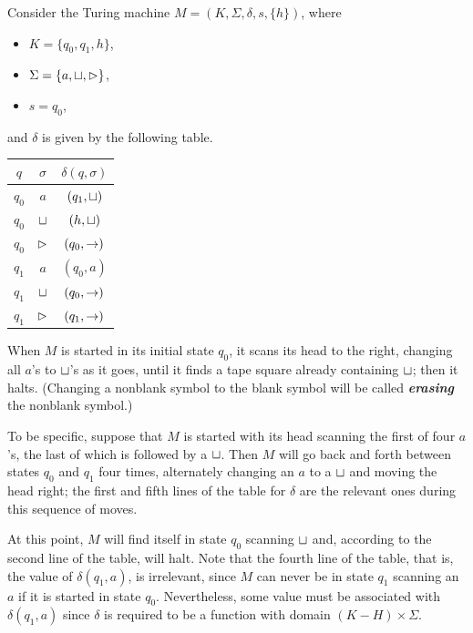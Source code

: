 \begin{example}{}
Consider the Turing machine $M = (K, \Sigma, \delta, s, \{h\})$, where
\begin{itemize}
  \item $K = \{ q_0, q_1, h \}$,
  \item $\Sigma = \{ a, \sqcup, \vartriangleright \}$, 
  \item $s = q_0$,
\end{itemize}
and $\delta$ is given by the following table. 
\begin{table}[H]
  \centering
  \begin{tabular}{|cc|c|} 
  \hline
  $q$ & $\sigma$ & $\delta(q, \sigma)$  \\ 
  \hline
  $q_0$  &  $a$       &  $(q_1, \sqcup)$ \\
  $q_0$  &  $\sqcup$  &  $(h, \sqcup)$   \\
  $q_0$  &  $\vartriangleright$    &  $(q_0, \rightarrow)$    \\
  $q_1$  &  $a$       &  $(q_0, a)$      \\
  $q_1$  &  $\sqcup$  &  $(q_0, \rightarrow)$    \\
  $q_1$  &  $\vartriangleright$    &  $(q_1, \rightarrow)$    \\
  \hline
  \end{tabular}
\end{table}
\quad When $M$ is started in its initial state $q_0$, it scans its head to the right, changing all $a$'s to $\sqcup$'s as it goes, until it finds a tape square already containing $\sqcup$; then it halts. (Changing a nonblank symbol to the blank symbol will be called \textit{\textbf{erasing}} the nonblank symbol.)

\quad To be specific, suppose that $M$ is started with its head scanning the first of four $a$'s, the last of which is followed by a $\sqcup$. Then $M$ will go back and forth between states $q_0$ and $q_1$ four times, alternately changing an $a$ to a $\sqcup$ and moving the head right; the first and fifth lines of the table for $\delta$ are the relevant ones during this sequence of moves. 

\quad At this point, $M$ will find itself in state $q_0$ scanning $\sqcup$ and, according to the second line of the table, will halt. Note that the fourth line of the table, that is, the value of $\delta(q_1, a)$, is irrelevant, since $M$ can never be in state $q_1$ scanning an $a$ if it is started in state $q_0$. Nevertheless, some value must be associated with $\delta(q_1, a)$ since $\delta$ is required to be a function with domain $(K - H) \times \Sigma$.
\end{example}

